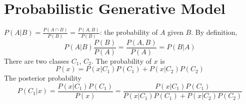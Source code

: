 \documentclass{article}
\begin{document}
    \section{Probabilistic Generative Model}
        $P(A|B)=\frac{P(A\cap B)}{P(B)}=\frac{P(A,B)}{P(B)}$: the probability of $A$ given $B$. By definition,
        \[
            P(A|B)\frac{P(B)}{P(A)}=\frac{P(A,B)}{P(A)}=P(B|A)
        \]
        There are two classes $C_1$, $C_2$. The probability of $x$ is
        \[
            P(x)=P(x|C_1)P(C_1)+P(x|C_2)P(C_2)
        \]
        The posterior probability
        \[
            P(C_1|x)=\frac{P(x|C_1)P(C_1)}{P(x)}=\frac{P(x|C_1)P(C_1)}{P(x|C_1)P(C_1)+P(x|C_2)P(C_2)}
        \]
\end{document}
